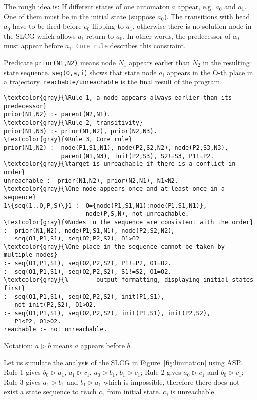 The rough idea is: If different states of one automaton $a$ appear, e.g. $a_0$ and $a_1$.
One of them must be in the initial state (suppose $a_0$).
The transitions with head $a_0$ have to be fired before $a_0$ flipping to $a_1$, otherwise there is no solution node in the SLCG which allows $a_1$ return to $a_0$.
In other words, the predecessor of $a_0$ must appear before $a_1$. \texttt{\textcolor{gray}{Core rule}} describes this constraint.

Predicate \texttt{prior(N1,N2)} means node $N_1$ appears earlier than $N_2$ in the resulting state sequence.
\texttt{seq(O,a,i)} shows that state node $a_i$ appears in the O-th place in a trajectory.
\texttt{reachable/unreachable} is the final result of the program.

\begin{Verbatim}[commandchars=\\\{\}]
\textcolor{gray}{%Rule 1, a node appears always earlier than its predecessor}
prior(N1,N2) :- parent(N2,N1).
\textcolor{gray}{%Rule 2, transitivity}
prior(N1,N3) :- prior(N1,N2), prior(N2,N3).
\textcolor{gray}{%Rule 3, Core rule}
prior(N1,N2) :- node(P1,S1,N1), node(P2,S2,N2), node(P2,S3,N3), 
                parent(N1,N3), init(P2,S3), S2!=S3, P1!=P2. 
\textcolor{gray}{%target is unreachable if there is a conflict in order}
unreachable :- prior(N1,N2), prior(N2,N1), N1<N2.
\textcolor{gray}{%One node appears once and at least once in a sequence}
1\{seq(1..O,P,S)\}1 :- O={node(P1,S1,N1):node(P1,S1,N1)},
                       node(P,S,N), not unreachable.
\textcolor{gray}{%Nodes in the sequence are consistent with the order}
:- prior(N1,N2), node(P1,S1,N1), node(P2,S2,N2),
   seq(O1,P1,S1), seq(O2,P2,S2), O1>O2.
\textcolor{gray}{%One place in the sequence cannot be taken by multiple nodes}
:- seq(O1,P1,S1), seq(O2,P2,S2), P1!=P2, O1=O2.
:- seq(O1,P1,S1), seq(O2,P2,S2), S1!=S2, O1=O2.
\textcolor{gray}{%--------output formatting, displaying initial states first}
:- seq(O1,P1,S1), seq(O2,P2,S2), init(P1,S1),
   not init(P2,S2), O1>O2.
:- seq(O1,P1,S1), seq(O2,P2,S2), init(P1,S1), init(P2,S2),
   P1<P2, O1>O2.
reachable :- not unreachable.
\end{Verbatim}

Notation: $a\rhd b$ means $a$ appears before $b$.



\begin{example}
Let us simulate the analysis of the SLCG in Figure~\ref{fig:limitation} using ASP.
Rule 1 gives $b_0\rhd a_1$, $a_1\rhd c_1$, $a_0\rhd b_1$, $b_1\rhd c_1$; Rule 2 gives $a_0\rhd c_1$ and $b_0\rhd c_1$; Rule 3 gives $a_1\rhd b_1$ and $b_1\rhd a_1$ which is impossible, therefore there does not exist a state sequence to reach $c_1$ from initial state.
$c_1$ is unreachable.
\end{example}

